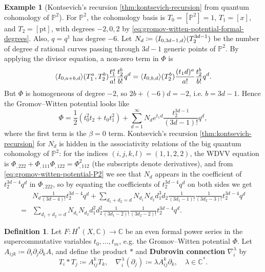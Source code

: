 \documentclass{report}
\theoremstyle{plain}
\theoremstyle{definition}
\newtheorem{definition}[theorem]{Definition}
\newtheorem{example}[theorem]{Example}
\theoremstyle{remark}
\newcommand{\di}{\partial}
\newcommand{\bC}{\mathbb{C}}
\newcommand{\bP}{\mathbb{P}}
\newcommand{\pt}{\mathrm{pt}}
\DeclarePairedDelimiter{\inner}{\langle}{\rangle}
\begin{document}
\begin{example}[Kontsevich's recursion \ref{thm:kontsevich-recursion} from quantum cohomology of $\bP^2$]
  For $\bP^2$, the cohomology basis is $T_0 = [\bP^2] = 1$, $T_1 =
  [x]$, and $T_2 = [\pt]$, with degrees $-2, 0, 2$ by
  \eqref{eq:gromov-witten-potential-formal-degrees}. Also, $q = q^1$
  has degree $-6$. Let $N_d \coloneqq
  \inner{I_{0,3d-1,d}}(T_2^{3d-1})$ be the number of degree $d$
  rational curves passing through $3d-1$ generic points of $\bP^2$. By
  applying the divisor equation, a non-zero term in $\Phi$ is
  \[ \inner{I_{0,a+b,d}}(T_1^a, T_2^b) \frac{t_1^a}{a!} \frac{t_2^b}{b!} q^d = \inner{I_{0,b,d}}(T_2^b) \frac{(t_1d)^a}{a!} \frac{t_2^b}{b!} q^d. \]
  But $\Phi$ is homogeneous of degree $-2$, so $2b + (-6)d = -2$, i.e.
  $b = 3d-1$. Hence the Gromov--Witten potential looks like
  \begin{equation} \label{eq:gromov-witten-potential-P2}
    \Phi = \frac{1}{2}(t_0^2 t_2 + t_0t_1^2) + \sum_{d=1}^\infty N_d e^{t_1d} \frac{t_2^{3d-1}}{(3d-1)!} q^d,
  \end{equation}
  where the first term is the $\beta=0$ term. Kontsevich's recursion
  \ref{thm:kontsevich-recursion} for $N_d$ is hidden in the
  associativity relations of the big quantum cohomology of $\bP^2$:
  for the indices $(i,j,k,l) = (1,1,2,2)$, the WDVV equation is
  $\Phi_{,222} + \Phi_{,111}\Phi_{,122} = \Phi_{,112}^2$ (the
  subscripts denote derivatives), and from
  \eqref{eq:gromov-witten-potential-P2} we see that $N_d$ appears in
  the coefficient of $t_2^{3d-4}q^d$ in $\Phi_{,222}$, so by equating
  the coefficients of $t_2^{3d-4}q^d$ on both sides we get
  \begin{align*}
    &N_d \frac{1}{(3d-4)!} t_2^{3d-4} q^d + \sum_{d_1+d_2=d} N_{d_1}N_{d_2} d_1^3d_2 \frac{1}{(3d_1-1)!} \frac{1}{(3d_2-3)!} t_2^{3d-4} q^d \\
    = &\sum_{d_1+d_2=d} N_{d_1} N_{d_2} d_1^2 d_2^2 \frac{1}{(3d_1-2)!} \frac{1}{(3d_2-2)!} t_2^{3d-4} q^d.
  \end{align*}
\end{example}

\begin{definition} \label{def:dubrovin-connection}
  Let $F\colon H^*(X, \bC) \to \bC$ be an even formal power series in
  the supercommutative variables $t_0, \ldots, t_m$, e.g. the
  Gromov--Witten potential $\Phi$. Let $A_{ijk} \coloneqq \di_i \di_j
  \di_k A$, and define the product $*$ and {\bf Dubrovin connection}
  $\nabla_i^\lambda$ by
  \[ T_i * T_j \coloneqq A^k_{ij} T_k, \quad \nabla_i^\lambda(\di_j) \coloneqq \lambda A^k_{ij} \di_k, \quad \lambda \in \bC^*. \]
\end{definition}
\end{document}
